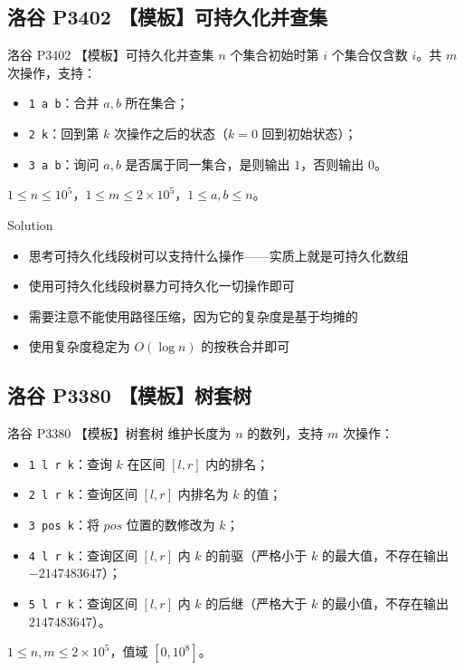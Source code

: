 ﻿\documentclass[aspectratio=169]{ctexbeamer}
\begin{document}
\subsection{洛谷 P3402 【模板】可持久化并查集}

\begin{frame}{洛谷 P3402 【模板】可持久化并查集}
    $n$ 个集合初始时第 $i$ 个集合仅含数 $i$。共 $m$ 次操作，支持：
    \begin{itemize}
        \item \texttt{1 a b}：合并 $a,b$ 所在集合；
        \item \texttt{2 k}：回到第 $k$ 次操作之后的状态（$k=0$ 回到初始状态）；
        \item \texttt{3 a b}：询问 $a,b$ 是否属于同一集合，是则输出 $1$，否则输出 $0$。
    \end{itemize}

    $1\le n\le 10^5$，$1\le m\le 2\times 10^5$，$1\le a,b\le n$。
\end{frame}

\begin{frame}{Solution}
    \begin{itemize}
        \item 思考可持久化线段树可以支持什么操作——实质上就是可持久化数组
        \item 使用可持久化线段树暴力可持久化一切操作即可
        \item 需要注意不能使用路径压缩，因为它的复杂度是基于均摊的
        \item 使用复杂度稳定为 $O(\log n)$ 的按秩合并即可
    \end{itemize}
\end{frame}

\subsection{洛谷 P3380 【模板】树套树}

\begin{frame}{洛谷 P3380 【模板】树套树}
    维护长度为 $n$ 的数列，支持 $m$ 次操作：
    \begin{itemize}
        \item \texttt{1 l r k}：查询 $k$ 在区间 $[l,r]$ 内的排名；
        \item \texttt{2 l r k}：查询区间 $[l,r]$ 内排名为 $k$ 的值；
        \item \texttt{3 pos k}：将 $pos$ 位置的数修改为 $k$；
        \item \texttt{4 l r k}：查询区间 $[l,r]$ 内 $k$ 的前驱（严格小于 $k$ 的最大值，不存在输出 $-2147483647$）；
        \item \texttt{5 l r k}：查询区间 $[l,r]$ 内 $k$ 的后继（严格大于 $k$ 的最小值，不存在输出 $2147483647$）。
    \end{itemize}
    
    $1\le n,m\le 2\times 10^5$，值域 $[0,10^8]$。
\end{frame}
\end{document}
